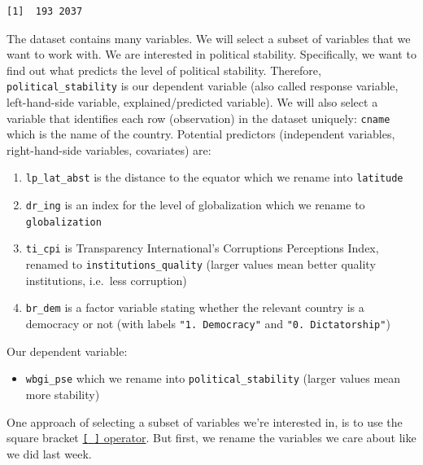 \documentclass[]{article}
\providecommand{\tightlist}{%
  \setlength{\itemsep}{0pt}\setlength{\parskip}{0pt}}
\theoremstyle{definition}
\theoremstyle{definition}
\theoremstyle{definition}
\theoremstyle{remark}
\begin{document}
\begin{verbatim}
[1]  193 2037
\end{verbatim}

The dataset contains many variables. We will select a subset of
variables that we want to work with. We are interested in political
stability. Specifically, we want to find out what predicts the level of
political stability. Therefore, \texttt{political\_stability} is our
dependent variable (also called response variable, left-hand-side
variable, explained/predicted variable). We will also select a variable
that identifies each row (observation) in the dataset uniquely:
\texttt{cname} which is the name of the country. Potential predictors
(independent variables, right-hand-side variables, covariates) are:

\begin{enumerate}
\def\labelenumi{\arabic{enumi}.}
\tightlist
\item
  \texttt{lp\_lat\_abst} is the distance to the equator which we rename
  into \texttt{latitude}
\item
  \texttt{dr\_ing} is an index for the level of globalization which we
  rename to \texttt{globalization}
\item
  \texttt{ti\_cpi} is Transparency International's Corruptions
  Perceptions Index, renamed to \texttt{institutions\_quality} (larger
  values mean better quality institutions, i.e.~less corruption)
\item
  \texttt{br\_dem} is a factor variable stating whether the relevant
  country is a democracy or not (with labels \texttt{"1.\ Democracy"}
  and \texttt{"0.\ Dictatorship"})
\end{enumerate}

Our dependent variable:

\begin{itemize}
\tightlist
\item
  \texttt{wbgi\_pse} which we rename into \texttt{political\_stability}
  (larger values mean more stability)
\end{itemize}

One approach of selecting a subset of variables we're interested in, is
to use the square bracket
\href{http://bit.ly/R_extract}{\texttt{{[}\ {]}} operator}. But first,
we rename the variables we care about like we did last week.
\end{document}
